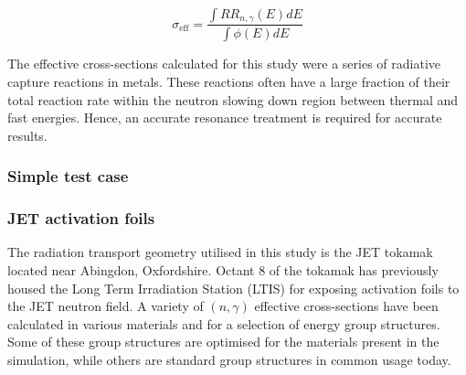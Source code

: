 \begin{equation}
\label{eq:pw}
\sigma_\mathrm{eff} = \frac{\int RR_{n,\gamma}(E) dE}{\int \phi(E) dE}
\end{equation}


The effective cross-sections calculated for this study were a series of radiative capture reactions in metals. These reactions often have a large fraction of their total reaction rate within the neutron slowing down region between thermal and fast energies. Hence, an accurate resonance treatment is required for accurate results. 

\subsubsection{Simple test case}

\subsubsection{JET activation foils}

The radiation transport geometry utilised in this study is the JET tokamak located near Abingdon, Oxfordshire. Octant 8 of the tokamak has previously housed the Long Term Irradiation Station (LTIS) for exposing activation foils to the JET neutron field. A variety of $(n,\gamma)$ effective cross-sections have been calculated in various materials and for a selection of energy group structures. Some of these group structures are optimised for the materials present in the simulation, while others are standard group structures in common usage today. 

